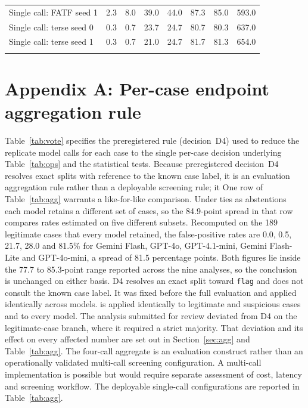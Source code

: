 \documentclass[pdflatex,sn-basic,Numbered]{sn-jnl}
\newcommand{\HLtext}[1]{\texthl{#1}}
\newcommand{\HLdel}[1]{\textcolor{HLink}{\sout{#1}}}
\renewcommand{\HLtext}[1]{#1}\renewcommand{\HLdel}[1]{#1}%
\begin{document}
\begin{table}[t]
\begin{tabular*}{\textwidth}{@{\extracolsep\fill}lrrrrrrr}
\HLtext{Single call: FATF seed 1}                  & \HLtext{2.3} & \HLtext{8.0} & \HLtext{39.0} & \HLtext{44.0} & \HLtext{87.3} & \HLtext{85.0} & \HLtext{593.0} \\
\HLtext{Single call: terse seed 0}                 & \HLtext{0.3} & \HLtext{0.7} & \HLtext{23.7} & \HLtext{24.7} & \HLtext{80.7} & \HLtext{80.3} & \HLtext{637.0} \\
\HLtext{Single call: terse seed 1}                 & \HLtext{0.3} & \HLtext{0.7} & \HLtext{21.0} & \HLtext{24.7} & \HLtext{81.7} & \HLtext{81.3} & \HLtext{654.0} \\
\botrule
\end{tabular*}
\end{table}

\clearpage
\section*{Appendix A: Per-case endpoint aggregation rule}

Table~\ref{tab:vote} specifies the preregistered rule (decision~D4) used to reduce the replicate model calls for each case to the single per-case decision underlying Table~\ref{tab:ops} and the statistical tests. \HLdel{Because preregistered decision~D4 resolves exact splits with reference to the known case label, it is an evaluation aggregation rule rather than a deployable screening rule; it} \HLtext{One row of} Table~\ref{tab:agg} \HLtext{warrants a like-for-like comparison. Under ties as abstentions each model retains a different set of cases, so the 84.9-point spread in that row compares rates estimated on five different subsets. Recomputed on the 189 legitimate cases that every model retained, the false-positive rates are 0.0, 0.5, 21.7, 28.0 and 81.5}\% \HLtext{for Gemini Flash, GPT-4o, GPT-4.1-mini, Gemini Flash-Lite and GPT-4o-mini, a spread of 81.5 percentage points. Both figures lie inside the 77.7 to 85.3-point range reported across the nine analyses, so the conclusion is unchanged on either basis. D4 resolves an exact split toward} \texttt{flag} \HLtext{and does not consult the known case label. It} was fixed before the full evaluation and \HLdel{applied identically across models.} \HLtext{is applied identically to legitimate and suspicious cases and to every model. The analysis submitted for review deviated from D4 on the legitimate-case branch, where it required a strict majority. That deviation and its effect on every affected number are set out in} Section~\ref{sec:agg} \HLtext{and} Table~\ref{tab:agg}\HLtext{. The four-call aggregate is an evaluation construct rather than an operationally validated multi-call screening configuration. A multi-call implementation is possible but would require separate assessment of cost, latency and screening workflow. The deployable single-call configurations are reported in} Table~\ref{tab:agg}\HLtext{.}
\end{document}
